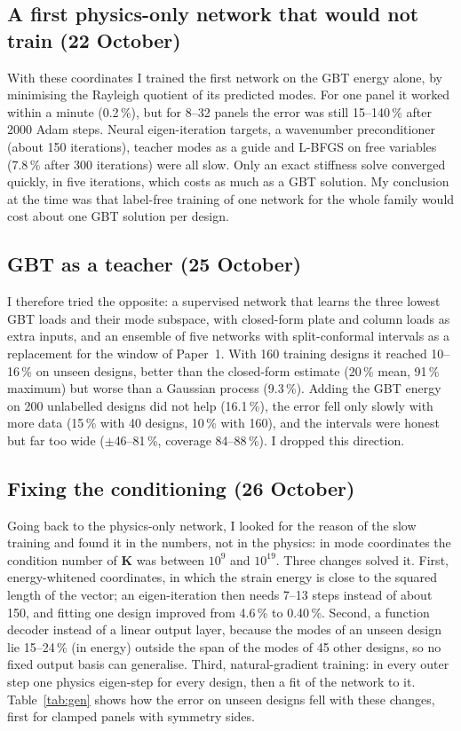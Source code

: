 \documentclass[11pt,a4paper]{article}
\newcommand{\pc}{\,\%}
\begin{document}
\subsection{A first physics-only network that would not train (22 October)}
With these coordinates I trained the first network on the GBT energy alone, by minimising the Rayleigh quotient of its predicted modes. For one panel it worked within a minute (0.2\pc), but for 8--32 panels the error was still 15--140\pc{} after 2000 Adam steps. Neural eigen-iteration targets, a wavenumber preconditioner (about 150 iterations), teacher modes as a guide and L-BFGS on free variables (7.8\pc{} after 300 iterations) were all slow. Only an exact stiffness solve converged quickly, in five iterations, which costs as much as a GBT solution. My conclusion at the time was that label-free training of one network for the whole family would cost about one GBT solution per design.

\subsection{GBT as a teacher (25 October)}
I therefore tried the opposite: a supervised network that learns the three lowest GBT loads and their mode subspace, with closed-form plate and column loads as extra inputs, and an ensemble of five networks with split-conformal intervals as a replacement for the window of Paper~1. With 160 training designs it reached 10--16\pc{} on unseen designs, better than the closed-form estimate (20\pc{} mean, 91\pc{} maximum) but worse than a Gaussian process (9.3\pc). Adding the GBT energy on 200 unlabelled designs did not help (16.1\pc), the error fell only slowly with more data (15\pc{} with 40 designs, 10\pc{} with 160), and the intervals were honest but far too wide ($\pm$46--81\pc, coverage 84--88\pc). I dropped this direction.

\subsection{Fixing the conditioning (26 October)}
Going back to the physics-only network, I looked for the reason of the slow training and found it in the numbers, not in the physics: in mode coordinates the condition number of $\mathbf K$ was between $10^{9}$ and $10^{19}$. Three changes solved it. First, energy-whitened coordinates, in which the strain energy is close to the squared length of the vector; an eigen-iteration then needs 7--13 steps instead of about 150, and fitting one design improved from 4.6\pc{} to 0.40\pc. Second, a function decoder instead of a linear output layer, because the modes of an unseen design lie 15--24\pc{} (in energy) outside the span of the modes of 45 other designs, so no fixed output basis can generalise. Third, natural-gradient training: in every outer step one physics eigen-step for every design, then a fit of the network to it. Table~\ref{tab:gen} shows how the error on unseen designs fell with these changes, first for clamped panels with symmetry sides.
\end{document}
